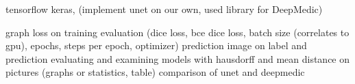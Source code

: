 
tensorflow keras, (implement unet on our own, used library for DeepMedic)

graph loss on training evaluation (dice loss, bce dice loss, batch size (correlates to gpu), epochs, steps per epoch, optimizer)
prediction
image on label and prediction 
evaluating and examining models with hausdorff and mean distance on pictures (graphs or statistics, table)
comparison of unet and deepmedic
